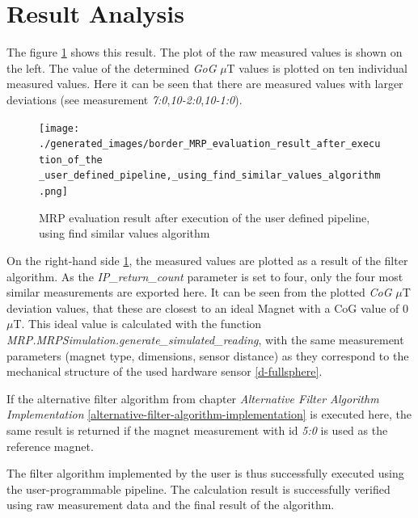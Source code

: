 \hypertarget{result-analysis}{%
\section{Result Analysis}\label{result-analysis}}

The figure
\ref{MRP_evaluation_result_after_execution_of_the _user_defined_pipeline,_using_find_similar_values_algorithm.png}
shows this result. The plot of the raw measured values is shown on the
left. The value of the determined \emph{GoG} \(\mu\)T values is plotted
on ten individual measured values. Here it can be seen that there are
measured values with larger deviations (see measurement
\emph{7:0},\emph{10-2:0},\emph{10-1:0}).

\begin{figure}
\centering
\texttt{[image: ./generated\_images/border\_MRP\_evaluation\_result\_after\_execution\_of\_the \_user\_defined\_pipeline,\_using\_find\_similar\_values\_algorithm.png]}
\caption{MRP evaluation result after execution of the user defined
pipeline, using find similar values algorithm
\label{MRP_evaluation_result_after_execution_of_the _user_defined_pipeline,_using_find_similar_values_algorithm.png}}
\end{figure}

On the right-hand side
\ref{MRP_evaluation_result_after_execution_of_the _user_defined_pipeline,_using_find_similar_values_algorithm.png},
the measured values are plotted as a result of the filter algorithm. As
the \emph{IP\_return\_count} parameter is set to four, only the four
most similar measurements are exported here. It can be seen from the
plotted \emph{CoG} \(\mu\)T deviation values, that these are closest to
an ideal Magnet with a CoG value of 0\(\mu\)T. This ideal value is
calculated with the function
\emph{MRP.MRPSimulation.generate\_simulated\_reading}, with the same
measurement parameters (magnet type, dimensions, sensor distance) as
they correspond to the mechanical structure of the used hardware sensor
\ref{d-fullsphere}.

If the alternative filter algorithm from chapter \emph{Alternative
Filter Algorithm Implementation}
\ref{alternative-filter-algorithm-implementation} is executed here, the
same result is returned if the magnet measurement with \gls{id}
\emph{5:0} is used as the reference magnet.

The filter algorithm implemented by the user is thus successfully
executed using the user-programmable pipeline. The calculation result is
successfully verified using raw measurement data and the final result of
the algorithm.

